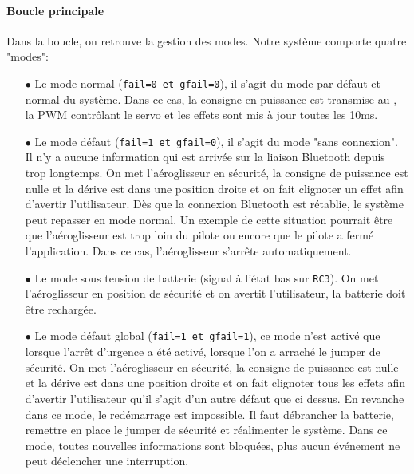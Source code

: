			\paragraph{Boucle principale} Dans la boucle, on retrouve la gestion des modes. Notre système comporte quatre "modes":
			\begin{itemize}
			\item[$\bullet$] Le mode normal (\texttt{fail=0 et gfail=0}), il s'agit du mode par défaut et normal du système. Dans ce cas, la consigne en puissance est transmise au \dspic, la PWM contrôlant le servo et les effets sont mis à jour toutes les 10ms.
			\item[$\bullet$] Le mode défaut (\texttt{fail=1 et gfail=0}), il s'agit du mode "sans connexion". Il n'y a aucune information qui est arrivée sur la liaison Bluetooth depuis trop longtemps. On met l'aéroglisseur en sécurité, la consigne de puissance est nulle et la dérive est dans une position droite et on fait clignoter un effet afin d'avertir l'utilisateur. Dès que la connexion Bluetooth est rétablie, le système peut repasser en mode normal. Un exemple de cette situation pourrait être que l'aéroglisseur est trop loin du pilote ou encore que le pilote a fermé l'application. Dans ce cas, l'aéroglisseur s'arrête automatiquement.
			\item[$\bullet$] Le mode sous tension de batterie (signal à l'état bas sur \texttt{RC3}). On met l'aéroglisseur en position de sécurité et on avertit l'utilisateur, la batterie doit être rechargée.
			\item[$\bullet$] Le mode défaut global (\texttt{fail=1 et gfail=1}), ce mode n'est activé que lorsque l'arrêt d'urgence a été activé, lorsque l'on a arraché le jumper de sécurité. On met l'aéroglisseur en sécurité, la consigne de puissance est nulle et la dérive est dans une position droite et on fait clignoter tous les effets afin d'avertir l'utilisateur qu'il s'agit d'un autre défaut que ci dessus. En revanche dans ce mode, le redémarrage est impossible. Il faut débrancher la batterie, remettre en place le jumper de sécurité et réalimenter le système. Dans ce mode, toutes nouvelles informations sont bloquées, plus aucun événement ne peut déclencher une interruption. 
			\end{itemize}
			
			
